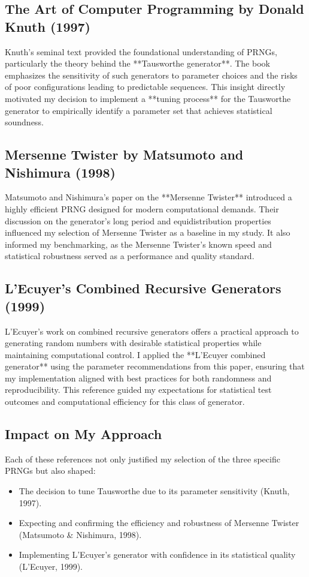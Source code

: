 \documentclass[twocolumn,12pt]{article}
\begin{document}
\subsection{The Art of Computer Programming by Donald Knuth (1997)}
Knuth's seminal text \cite{knuth1997art} provided the foundational understanding of PRNGs, particularly the theory behind the **Tausworthe generator**. The book emphasizes the sensitivity of such generators to parameter choices and the risks of poor configurations leading to predictable sequences. This insight directly motivated my decision to implement a **tuning process** for the Tausworthe generator to empirically identify a parameter set that achieves statistical soundness.

\subsection{Mersenne Twister by Matsumoto and Nishimura (1998)}
Matsumoto and Nishimura’s paper on the **Mersenne Twister** \cite{matsumoto1998mersenne} introduced a highly efficient PRNG designed for modern computational demands. Their discussion on the generator’s long period and equidistribution properties influenced my selection of Mersenne Twister as a baseline in my study. It also informed my benchmarking, as the Mersenne Twister’s known speed and statistical robustness served as a performance and quality standard.

\subsection{L’Ecuyer’s Combined Recursive Generators (1999)}
L’Ecuyer’s work \cite{lecuyer1999good} on combined recursive generators offers a practical approach to generating random numbers with desirable statistical properties while maintaining computational control. I applied the **L’Ecuyer combined generator** using the parameter recommendations from this paper, ensuring that my implementation aligned with best practices for both randomness and reproducibility. This reference guided my expectations for statistical test outcomes and computational efficiency for this class of generator.

\subsection{Impact on My Approach}
Each of these references not only justified my selection of the three specific PRNGs but also shaped:
\begin{itemize}
    \item The decision to tune Tausworthe due to its parameter sensitivity (Knuth, 1997).
    \item Expecting and confirming the efficiency and robustness of Mersenne Twister (Matsumoto \& Nishimura, 1998).
    \item Implementing L’Ecuyer’s generator with confidence in its statistical quality (L’Ecuyer, 1999).
\end{itemize}
\end{document}

